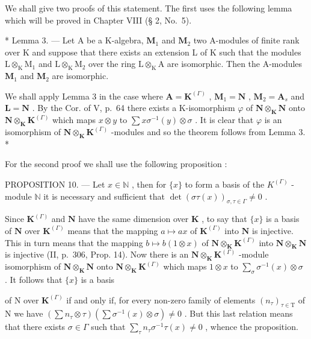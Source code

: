 We shall give two proofs of this statement. The first uses the following lemma which will be proved in Chapter VIII (§ 2, No.~5).

* Lemma 3. --- Let A be a K-algebra, \(\mathbf{M}_1\) and \(\mathbf{M}_2\) two A-modules of finite rank over K and suppose that there exists an extension L of K such that the modules \(\mathrm{L} \otimes_{\mathrm{K}} \mathrm{M}_1\) and \(\mathrm{L} \otimes_{\mathrm{K}} \mathrm{M}_2\) over the ring \(\mathrm{L} \otimes_{\mathrm{K}} \mathrm{A}\) are isomorphic. Then the A-modules \(\mathbf{M}_1\) and \(\mathbf{M}_2\) are isomorphic.

We shall apply Lemma 3 in the case where \(\mathbf{A} = \mathbf{K}^{(\Gamma)}\) , \(\mathbf{M}_1 = \mathbf{N}\) , \(\mathbf{M}_2 = \mathbf{A}_s\) and \(\mathbf{L} = \mathbf{N}\) . By the Cor. of V, p.~64 there exists a K-isomorphism \(\varphi\) of \(\mathbf{N} \otimes_{\mathbf{K}} \mathbf{N}\) onto \(\mathbf{N} \otimes_{\mathbf{K}} \mathbf{K}^{(\Gamma)}\) which maps \(x \otimes y\) to \(\sum x \sigma^{-1}(y) \otimes \sigma\) . It is clear that \(\varphi\) is an isomorphism of \(\mathbf{N} \otimes_{\mathbf{K}} \mathbf{K}^{(\Gamma)}\) -modules and so the theorem follows from Lemma 3. *

For the second proof we shall use the following proposition :

PROPOSITION 10. --- Let \(x \in \mathbb{N}\) , then for \(\{x\}\) to form a basis of the \(K^{(\Gamma)}\) -module \(\mathbb{N}\) it is necessary and sufficient that \(\det(\sigma\tau(x))_{\sigma,\tau \in \Gamma} \neq 0\) .

Since \(\mathbf{K}^{(\Gamma)}\) and \(\mathbf{N}\) have the same dimension over \(\mathbf{K}\) , to say that \(\{x\}\) is a basis of \(\mathbf{N}\) over \(\mathbf{K}^{(\Gamma)}\) means that the mapping \(a \mapsto ax\) of \(\mathbf{K}^{(\Gamma)}\) into \(\mathbf{N}\) is injective. This in turn means that the mapping \(b \mapsto b(1 \otimes x)\) of \(\mathbf{N} \otimes_{\mathbf{K}} \mathbf{K}^{(\Gamma)}\) into \(\mathbf{N} \otimes_{\mathbf{K}} \mathbf{N}\) is injective (II, p.~306, Prop. 14). Now there is an \(\mathbf{N} \otimes_{\mathbf{K}} \mathbf{K}^{(\Gamma)}\) -module isomorphism of \(\mathbf{N} \otimes_{\mathbf{K}} \mathbf{N}\) onto \(\mathbf{N} \otimes_{\mathbf{K}} \mathbf{K}^{(\Gamma)}\) which maps \(1 \otimes x\) to \(\sum_{\sigma} \sigma^{-1}(x) \otimes \sigma\) . It follows that \(\{x\}\) is a basis

of N over \(\mathbf{K}^{(\Gamma)}\) if and only if, for every non-zero family of elements \((n_{\tau})_{\tau\in\mathrm{T}}\) of N we have \(\left(\sum n_{\tau}\otimes\tau\right)\left(\sum\sigma^{-1}(x)\otimes\sigma\right)\neq0\) . But this last relation means that there exists \(\sigma\in\Gamma\) such that \(\sum_{\tau}n_{\tau}\sigma^{-1}\tau(x)\neq0\) , whence the proposition.

